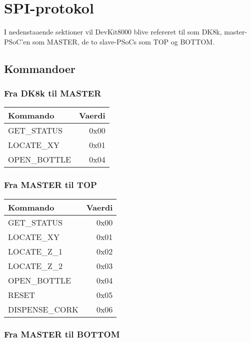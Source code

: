 \chapter{SPI-protokol}
\label{SPI-prot}

I nedenstaaende sektioner vil DevKit8000 blive refereret til som DK8k,
master-PSoC'en som MASTER, de to slave-PSoCs som TOP og BOTTOM.

\section{Kommandoer}
\subsection{Fra DK8k til MASTER}

\begin{table}[H]
\begin{tabular}{| l | r |}
\hline
Kommando & Vaerdi\\\hline
GET\_STATUS & 0x00\\\hline
LOCATE\_XY & 0x01\\\hline
OPEN\_BOTTLE & 0x04\\\hline
\end{tabular}
\end{table}

\subsection{Fra MASTER til TOP}

\begin{table}[H]
\begin{tabular}{| l | r |}
\hline
Kommando & Vaerdi\\\hline
GET\_STATUS & 0x00\\\hline
LOCATE\_XY & 0x01\\\hline
LOCATE\_Z\_1 & 0x02\\\hline
LOCATE\_Z\_2 & 0x03\\\hline
OPEN\_BOTTLE & 0x04\\\hline
RESET & 0x05\\\hline
DISPENSE\_CORK & 0x06\\\hline
\end{tabular}
\end{table}

\subsection{Fra MASTER til BOTTOM}

